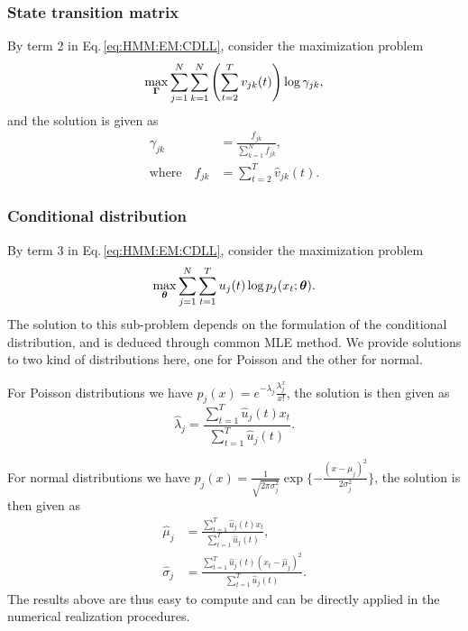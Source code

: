 \subsubsection{State transition matrix}
\label{sec:HMM:EM:algo:transition}
By term 2 in Eq.\,\ref{eq:HMM:EM:CDLL}, consider the maximization problem
		\begin{equation}
		\label{eq:HMM:EM:max:2}
		\max_{{\boldsymbol\Gamma}} \sum_{j=1}^{N}\sum_{k=1}^{N} \left(\sum_{t=2}^Tv_{jk}(t)\right)\log\gamma_{jk},
		\end{equation}
and the solution is given as
		\begin{equation}
		\label{eq:HMM:EM:sol:2}
		\begin{aligned}
		\gamma_{jk} & = \frac{f_{jk}}{\sum_{k=1}^{N} f_{jk}}, \\
		\text{where}\quad f_{jk} & = \sum_{t=2}^{T} \hat{v}_{jk}(t).
		\end{aligned}
		\end{equation}


\subsubsection{Conditional distribution}
\label{sec:HMM:EM:algo:distribution}
By term 3 in Eq.\,\ref{eq:HMM:EM:CDLL}, consider the maximization problem
		\begin{equation}
		\label{eq:HMM:EM:max:3}
		\max_{{\boldsymbol\theta}} \sum_{j=1}^{N}\sum_{t=1}^{T} u_j(t)\log p_j(x_t;{\boldsymbol\theta}).
		\end{equation}
The solution to this sub-problem depends on the formulation of the conditional distribution,
and is deduced through common MLE method.
We provide solutions to two kind of distributions here,
one for Poisson and the other for normal.

For Poisson distributions we have $p_j(x) = e^{-\lambda_j}\frac{\lambda_j^x}{x!}$,
the solution is then given as 
		\begin{equation}
		\label{eq:HMM:EM:sol:3:poisson}
		\hat{\lambda}_j = \frac{\sum_{t=1}^{T} \hat{u}_j(t)x_t}{\sum_{t=1}^{T} \hat{u}_j(t)}.
		\end{equation}

For normal distributions we have 
$p_j(x) = \frac{1}{\sqrt{2\pi\sigma_j^2}} \exp\{-\frac{(x-\mu_j)^2}{2\sigma_j^2}\}$,
the solution is then given as 
		\begin{subequations}
		\begin{align}
		\label{eq:HMM:EM:sol:3:normal:mu}
		\hat{\mu}_j & = \frac{\sum_{t=1}^{T} \hat{u}_j(t)x_t}{\sum_{t=1}^{T} \hat{u}_j(t)}, \\
		\label{eq:HMM:EM:sol:3:normal:sigma}
		\hat{\sigma}_j & = \frac{\sum_{t=1}^{T} \hat{u}_j(t)(x_t - \hat{\mu}_j)^2}
							  {\sum_{t=1}^{T} \hat{u}_j(t)}.
		\end{align}
		\end{subequations}
The results above are thus easy to compute and can be 
directly applied in the numerical realization procedures.

